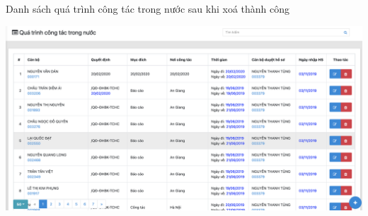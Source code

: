 Danh sách quá trình công tác trong nước sau khi xoá thành công
\begin{center}
  \captionsetup{type=figure}
  \includegraphics[width=15cm]{img/test/viewFirst.png}
\end{center}
